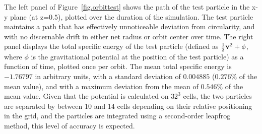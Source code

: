 The left panel of Figure~\ref{fig.orbittest} shows the path of the
test particle in the x-y plane (at z=$0.5$), plotted over the duration
of the simulation.  The test particle
maintains a path that has effectively unnoticeable deviation from
circularity, and with no discernable drift in either net radius or
orbit center over time.  The right panel displays the total specific
energy of the test particle (defined as $\frac{1}{2} {\bf v}^2 +
\phi$, where $\phi$ is the gravitational potential at the position of
the test particle) as a function of time, plotted once per orbit.  The
mean total specific energy is $-1.76797$ in arbitrary units, with a
standard deviation of $0.004885$ ($0.276\%$ of the mean value), and
with a maximum deviation from the mean of $0.546\%$ of the mean value.
Given that the potential is calculated on $32^3$ cells, the two
particles are separated by between 10 and 14 cells depending on their
relative positioning in the grid, and the particles are integrated
using a second-order leapfrog method, this level of accuracy is
expected.

